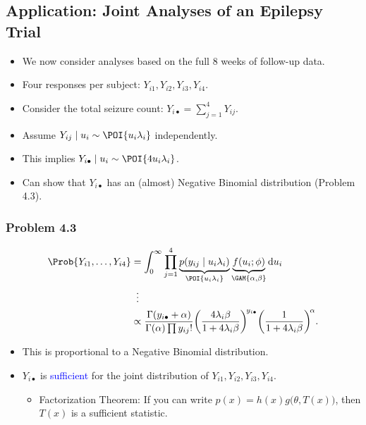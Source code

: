 \documentclass[oneside]{book}\usepackage[]{graphicx}\usepackage[svgnames]{xcolor}
\begin{document}
\subsection*{Application: Joint Analyses of an Epilepsy Trial}
\begin{itemize}
    \item We now consider analyses based on the full 8 weeks of follow-up data.
    \item Four responses per subject: $ Y_{i1},Y_{i2},Y_{i3},Y_{i4} $.
    \item Consider the total seizure count: $ Y_{i\bullet}=\sum_{j=1}^{4}Y_{ij} $.
    \item Assume $ Y_{ij}\mid u_i \sim \POI{u_i\lambda_i} $ independently.
    \item This implies \textcolor{Blue}{$ Y_{i\bullet}\mid u_i \sim \POI{4u_i\lambda_i} $}.
    \item Can show that $ Y_{i\bullet} $ has an (almost) Negative Binomial distribution (Problem 4.3).
\end{itemize}
\subsubsection*{Problem 4.3}
\begin{align*}
    \Prob{Y_{i1},\ldots,Y_{i4}}
     & =\int_{0}^{\infty}\prod_{j=1}^4\underbrace{p(y_{ij}\mid u_i\lambda_i)}_{\POI{u_i\lambda_i}}\underbrace{f(u_i;\phi)}_{\GAM{\alpha,\beta}}\odif{u_i}                                                   \\
     & \vdotswithin{=}                                                                                                                                                                                      \\
     & \propto \frac{\Gamma(y_{i\bullet}+\alpha)}{\Gamma(\alpha)\prod y_{ij}!}\biggl(\frac{4\lambda_i\beta}{1+4\lambda_i\beta}\biggr)^{\!y_{i\bullet}}\biggl(\frac{1}{1+4\lambda_i\beta}\biggr)^{\!\alpha}.
\end{align*}
\begin{itemize}
    \item This is proportional to a Negative Binomial distribution.
    \item $ Y_{i\bullet} $ is \textcolor{Blue}{sufficient} for the joint distribution of $ Y_{i1},Y_{i2},Y_{i3},Y_{i4} $.
          \begin{itemize}
              \item Factorization Theorem: If you can write $ p(x)=h(x)g\bigl(\theta,T(x)\bigr) $, then $ T(x) $ is a sufficient statistic.
          \end{itemize}
\end{itemize}
\end{document}
